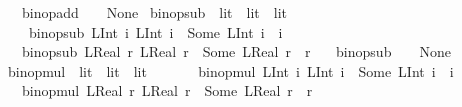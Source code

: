 \begin{isabellebody}
\ \ {\isacharbar}{\kern0pt}\ {\isachardoublequoteopen}binop{\isacharunderscore}{\kern0pt}add\ {\isacharunderscore}{\kern0pt}\ {\isacharunderscore}{\kern0pt}\ {\isacharequal}{\kern0pt}\ None{\isachardoublequoteclose}\isanewline
\isanewline
{}\isamarkupfalse%
\ binop{\isacharunderscore}{\kern0pt}sub\ {\isacharcolon}{\kern0pt}{\isacharcolon}{\kern0pt}\ {\isachardoublequoteopen}lit\ {\isasymRightarrow}\ lit\ {\isasymrightharpoonup}\ lit{\isachardoublequoteclose}\isanewline
\ \ \ \isanewline
\ \ \ \ {\isachardoublequoteopen}binop{\isacharunderscore}{\kern0pt}sub\ {\isacharparenleft}{\kern0pt}LInt\ i{}{\isacharparenright}{\kern0pt}\ {\isacharparenleft}{\kern0pt}LInt\ i{}{\isacharparenright}{\kern0pt}\ {\isacharequal}{\kern0pt}\ Some\ {\isacharparenleft}{\kern0pt}LInt\ {\isacharparenleft}{\kern0pt}i{}\ {\isacharminus}{\kern0pt}\ i{}{\isacharparenright}{\kern0pt}{\isacharparenright}{\kern0pt}{\isachardoublequoteclose}\isanewline
\ \ {\isacharbar}{\kern0pt}\ {\isachardoublequoteopen}binop{\isacharunderscore}{\kern0pt}sub\ {\isacharparenleft}{\kern0pt}LReal\ r{}{\isacharparenright}{\kern0pt}\ {\isacharparenleft}{\kern0pt}LReal\ r{}{\isacharparenright}{\kern0pt}\ {\isacharequal}{\kern0pt}\ Some\ {\isacharparenleft}{\kern0pt}LReal\ {\isacharparenleft}{\kern0pt}r{}\ {\isacharminus}{\kern0pt}\ r{}{\isacharparenright}{\kern0pt}{\isacharparenright}{\kern0pt}{\isachardoublequoteclose}\isanewline
\ \ {\isacharbar}{\kern0pt}\ {\isachardoublequoteopen}binop{\isacharunderscore}{\kern0pt}sub\ {\isacharunderscore}{\kern0pt}\ {\isacharunderscore}{\kern0pt}\ {\isacharequal}{\kern0pt}\ None{\isachardoublequoteclose}\isanewline
\isanewline
{}\isamarkupfalse%
\ binop{\isacharunderscore}{\kern0pt}mul\ {\isacharcolon}{\kern0pt}{\isacharcolon}{\kern0pt}\ {\isachardoublequoteopen}lit\ {\isasymRightarrow}\ lit\ {\isasymrightharpoonup}\ lit{\isachardoublequoteclose}\isanewline
\ \ \isanewline
\ \ \ \ {\isachardoublequoteopen}binop{\isacharunderscore}{\kern0pt}mul\ {\isacharparenleft}{\kern0pt}LInt\ i{}{\isacharparenright}{\kern0pt}\ {\isacharparenleft}{\kern0pt}LInt\ i{}{\isacharparenright}{\kern0pt}\ {\isacharequal}{\kern0pt}\ Some\ {\isacharparenleft}{\kern0pt}LInt\ {\isacharparenleft}{\kern0pt}i{}\ {\isacharasterisk}{\kern0pt}\ i{}{\isacharparenright}{\kern0pt}{\isacharparenright}{\kern0pt}{\isachardoublequoteclose}\isanewline
\ \ {\isacharbar}{\kern0pt}\ {\isachardoublequoteopen}binop{\isacharunderscore}{\kern0pt}mul\ {\isacharparenleft}{\kern0pt}LReal\ r{}{\isacharparenright}{\kern0pt}\ {\isacharparenleft}{\kern0pt}LReal\ r{}{\isacharparenright}{\kern0pt}\ {\isacharequal}{\kern0pt}\ Some\ {\isacharparenleft}{\kern0pt}LReal\ {\isacharparenleft}{\kern0pt}r{}\ {\isacharasterisk}{\kern0pt}\ r{}{\isacharparenright}{\kern0pt}{\isacharparenright}{\kern0pt}{\isachardoublequoteclose}\isanewline

\end{isabellebody}
